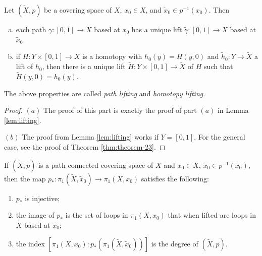 \begin{lemma}\label{lem:general-lift}
  Let $(\widetilde{X}, p)$ be a covering space of
  $X$, $x_0 \in X$, and $\widetilde{x}_0 \in p^{-1}(x_0)$.
  Then
  \begin{enumerate}[(a)]
    \item each path $\gamma : [0, 1] \to X$ based
      at $x_0$ has a unique lift $\widetilde{\gamma} : [0, 1] \to X$
      based at $\widetilde{x}_0$.
    \item if $H : Y \times [0, 1] \to X$ is a homotopy
      with $h_0(y) = H(y, 0)$ and
      $\widetilde{h}_0 : Y \to \widetilde{X}$ a lift of
      $h_0$, then there is a unique lift
      $\widetilde{H} : Y \times [0, 1] \to \widetilde{X}$
      of $H$ such that $\widetilde{H}(y, 0) = h_0(y)$.
  \end{enumerate}
  The above properties are called \emph{path lifting}
  and \emph{homotopy lifting}.
\end{lemma}

\begin{proof}
  $(a)$ The proof of this part is exactly the proof of
  part $(a)$ in Lemma \ref{lem:lifting}.

  $(b)$ The proof from Lemma \ref{lem:lifting} works
  if $Y = [0, 1]$. For the general case, see the proof
  of Theorem \ref{thm:theorem-23}.
\end{proof}

\begin{lemma}\label{lem:lemma-21}
  If $(\widetilde{X}, p)$ is a path connected
  covering space of $X$ and $x_0 \in X$,
  $\widetilde{x}_0 \in p^{-1}(x_0)$, then the map
  $p_* : \pi_1(\widetilde{X}, \widetilde{x}_0) \to
  \pi_1(X, x_0)$ satisfies the following:
  \begin{enumerate}
    \item $p_*$ is injective;
    \item the image of $p_*$ is the set of loops
      in $\pi_1(X, x_0)$ that when lifted are
      loops in $\widetilde{X}$ based at $\widetilde{x}_0$;
    \item the index $[\pi_1(X, x_0) : p_*(\pi_1(\widetilde{X}, \widetilde{x}_0))]$ is the degree of $(\widetilde{X}, p)$.
  \end{enumerate}
\end{lemma}

